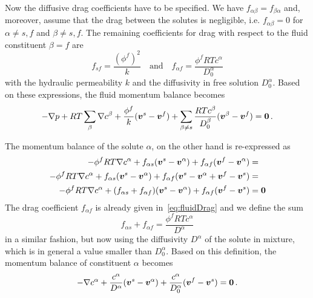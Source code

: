 \documentclass[a4paper,DIV=12,10pt]{scrartcl}
\newcommand{\V}[0]{\vek{v}}
\begin{document}
Now the diffusive drag coefficients have to be specified. We have
$f_{\alpha\beta} = f_{\beta\alpha}$ and, moreover, assume that the drag
between the solutes is negligible, i.e. $f_{\alpha\beta} = 0$ for $\alpha \neq
s, f$ and $\beta \neq s, f$. The remaining coefficients for drag with respect
to the fluid constituent $\beta = f$ are
\begin{equation}
  \label{eq:fluidDrag}
  f_{sf} = \frac{ (\phi^f)^2 }{k} \quad \text{and} \quad
  f_{\alpha f} = \frac{\phi^f RT c^\alpha}{D^\alpha_0}
\end{equation}
with the hydraulic permeability $k$ and the diffusivity in free solution
$D^\alpha_0$. 
Based on these expressions, the fluid momentum balance becomes
\begin{equation}
  - \nabla p + RT \sum_{\beta} \nabla c^\beta + \frac{\phi^f}{k} (\V^s - \V^f)
  + \sum_{\beta\neq s} \frac{RT c^\beta}{D_0^\beta} (\V^\beta - \V^f) = \vek{0}\,.
\end{equation}

The momentum balance of the solute $\alpha$, on the other hand is re-expressed
as
\begin{equation}
  \begin{aligned}
    -\phi^f RT \nabla c^\alpha + f_{\alpha s}(\V^s - \V^\alpha) 
    + f_{\alpha f} (\V^f - \V^\alpha) &= \\
    -\phi^f RT \nabla c^\alpha + f_{\alpha s}(\V^s - \V^\alpha) 
    + f_{\alpha f} (\V^s - \V^\alpha + \V^f - \V^s) &= \\
    -\phi^f RT \nabla c^\alpha + (f_{\alpha s} + f_{\alpha f} )(\V^s - \V^\alpha) 
    + f_{\alpha f} (\V^f - \V^s) &= \vek{0} 
   \end{aligned}
\end{equation}
The drag coefficient $f_{\alpha f}$ is already given in~\eqref{eq:fluidDrag}
and we define the sum 
\begin{equation}
  \label{eq:modDrag}
  f_{\alpha s} +  f_{\alpha f} = \frac{\phi^f RT c^\alpha}{D^\alpha}
\end{equation}
in a similar fashion, but now using the diffusivity $D^\alpha$ of the solute
in mixture, which is in general a value smaller than $D^\alpha_0$.
Based on this definition, the momentum balance of constituent $\alpha$ becomes
\begin{equation}
  - \nabla c^\alpha + \frac{c^\alpha}{D^\alpha}(\V^s - \V^\alpha) 
  + \frac{c^\alpha}{D^\alpha_0} (\V^f - \V^s) = \vek{0} \,.
\end{equation}
\end{document}
